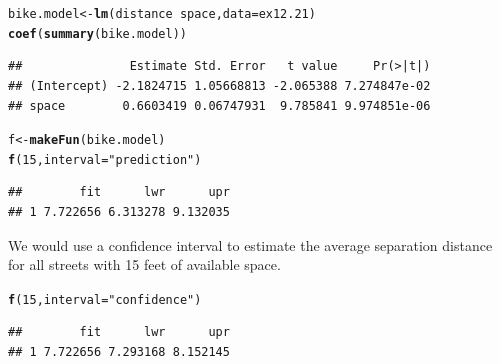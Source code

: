 \documentclass[twoside]{book}\usepackage[]{graphicx}\usepackage[]{xcolor}
\makeatletter
\newcommand{\hlnum}[1]{\textcolor[rgb]{0.686,0.059,0.569}{#1}}%
\newcommand{\hlstr}[1]{\textcolor[rgb]{0.192,0.494,0.8}{#1}}%
\newcommand{\hlopt}[1]{\textcolor[rgb]{0,0,0}{#1}}%
\newcommand{\hlstd}[1]{\textcolor[rgb]{0.345,0.345,0.345}{#1}}%
\newcommand{\hlkwb}[1]{\textcolor[rgb]{0.69,0.353,0.396}{#1}}%
\newcommand{\hlkwc}[1]{\textcolor[rgb]{0.333,0.667,0.333}{#1}}%
\newcommand{\hlkwd}[1]{\textcolor[rgb]{0.737,0.353,0.396}{\textbf{#1}}}%
\newenvironment{kframe}{%
 \def\at@end@of@kframe{}%
 \ifinner\ifhmode%
  \def\at@end@of@kframe{\end{minipage}}%
  \begin{minipage}{\columnwidth}%
 \fi\fi%
 \def\FrameCommand##1{\hskip\@totalleftmargin \hskip-\fboxsep
 \colorbox{shadecolor}{##1}\hskip-\fboxsep
     \hskip-\linewidth \hskip-\@totalleftmargin \hskip\columnwidth}%
 \MakeFramed {\advance\hsize-\width
   \@totalleftmargin\z@ \linewidth\hsize
   \@setminipage}}%
 {\par\unskip\endMakeFramed%
 \at@end@of@kframe}
\newenvironment{knitrout}{}{} %
\makeatother
\begin{document}
\begin{solution}
\begin{knitrout}
\color{fgcolor}\begin{kframe}
\begin{alltt}
\hlstd{bike.model} \hlkwb{<-} \hlkwd{lm}\hlstd{( distance} \hlopt{~} \hlstd{space,} \hlkwc{data}\hlstd{=ex12.21 )}
\hlkwd{coef}\hlstd{(}\hlkwd{summary}\hlstd{(bike.model))}
\end{alltt}
\begin{verbatim}
##               Estimate Std. Error   t value     Pr(>|t|)
## (Intercept) -2.1824715 1.05668813 -2.065388 7.274847e-02
## space        0.6603419 0.06747931  9.785841 9.974851e-06
\end{verbatim}
\begin{alltt}
\hlstd{f} \hlkwb{<-} \hlkwd{makeFun}\hlstd{(bike.model)}
\hlkwd{f}\hlstd{(} \hlnum{15}\hlstd{,} \hlkwc{interval}\hlstd{=}\hlstr{"prediction"} \hlstd{)}
\end{alltt}
\begin{verbatim}
##        fit      lwr      upr
## 1 7.722656 6.313278 9.132035
\end{verbatim}
\end{kframe}
\end{knitrout}
We would use a confidence interval to estimate the average separation distance 
for all streets with 15 feet of available space.
\begin{knitrout}
\color{fgcolor}\begin{kframe}
\begin{alltt}
\hlkwd{f}\hlstd{(} \hlnum{15}\hlstd{,} \hlkwc{interval}\hlstd{=}\hlstr{"confidence"} \hlstd{)}
\end{alltt}
\begin{verbatim}
##        fit      lwr      upr
## 1 7.722656 7.293168 8.152145
\end{verbatim}
\end{kframe}
\end{knitrout}
\end{solution}
\end{document}
